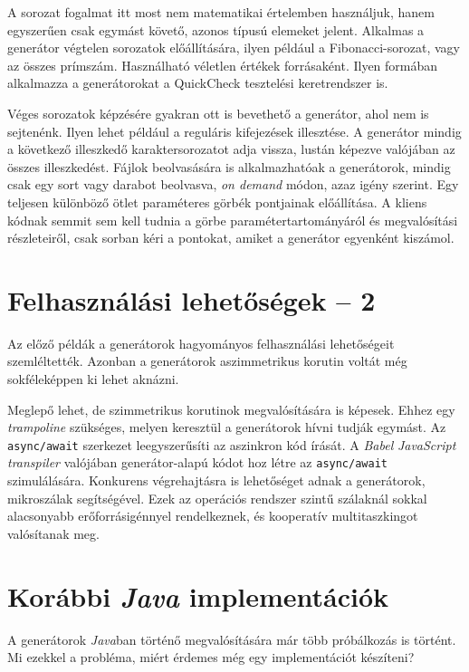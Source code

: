 \documentclass[12pt, a4paper]{article}
\begin{document}
A sorozat fogalmat itt most nem matematikai értelemben használjuk, hanem egyszerűen csak egymást követő, azonos típusú elemeket jelent. Alkalmas a generátor végtelen sorozatok előállítására, ilyen például a Fibonacci-sorozat, vagy az összes prímszám. Használható véletlen értékek forrásaként. Ilyen formában alkalmazza a generátorokat a QuickCheck tesztelési keretrendszer is.

Véges sorozatok képzésére gyakran ott is bevethető a generátor, ahol nem is sejtenénk. Ilyen lehet például a reguláris kifejezések illesztése. A generátor mindig a következő illeszkedő karaktersorozatot adja vissza, lustán képezve valójában az összes illeszkedést. Fájlok beolvasására is alkalmazhatóak a generátorok, mindig csak egy sort vagy darabot beolvasva, \textit{on demand} módon, azaz igény szerint. Egy teljesen különböző ötlet paraméteres görbék pontjainak előállítása. A kliens kódnak semmit sem kell tudnia a görbe paramétertartományáról és megvalósítási részleteiről, csak sorban kéri a pontokat, amiket a generátor egyenként kiszámol.

\section{Felhasználási lehetőségek -- 2}

Az előző példák a generátorok hagyományos felhasználási lehetőségeit szemléltették. Azonban a generátorok aszimmetrikus korutin voltát még sokféleképpen ki lehet aknázni.

Meglepő lehet, de szimmetrikus korutinok megvalósítására is képesek. Ehhez egy \textit{trampoline} szükséges, melyen keresztül a generátorok hívni tudják egymást. Az \texttt{async/await} szerkezet leegyszerűsíti az aszinkron kód írását. A \textit{Babel} \textit{JavaScript} \textit{transpiler} valójában generátor-alapú kódot hoz létre az \texttt{async/await} szimulálására. Konkurens végrehajtásra is lehetőséget adnak a generátorok, mikroszálak segítségével. Ezek az operációs rendszer szintű szálaknál sokkal alacsonyabb erőforrásigénnyel rendelkeznek, és kooperatív multitaszkingot valósítanak meg.

\section{Korábbi \textit{Java} implementációk}

A generátorok \textit{Java}ban történő megvalósítására már több próbálkozás is történt. Mi ezekkel a probléma, miért érdemes még egy implementációt készíteni?
\end{document}

